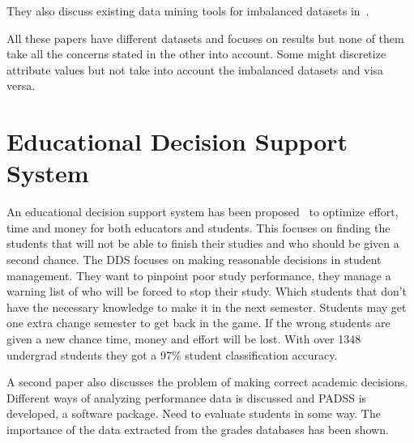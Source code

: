 \bigskip\noindent
They also discuss existing data mining tools for imbalanced datasets in~\cite{8}.

\bigskip\noindent
All these papers have different datasets and focuses on results but none of them take all the concerns stated in the other into account. 
Some might discretize attribute values but not take into account the imbalanced datasets and visa versa.

\section{Educational Decision Support System}
An educational decision support system has been proposed~\cite{5} to optimize effort, time and money for both educators and students. 
This focuses on finding the students that will not be able to finish their studies and who should be given a second chance. 
The DDS focuses on making reasonable decisions in student management. 
They want to pinpoint poor study performance, they manage a warning list of who will be forced to stop their study. 
Which students that don't have the necessary knowledge to make it in the next semester. 
Students may get one extra change semester to get back in the game. 
If the wrong students are given a new chance time, money and effort will be lost. 
With over 1348 undergrad students they got a 97\% student classification accuracy.

\bigskip\noindent
A second paper also discusses the problem of making correct academic decisions.~\cite{6} 
Different ways of analyzing performance data is discussed and PADSS is developed, a software package. 
Need to evaluate students in some way. The importance of the data extracted from the grades databases has been shown. 